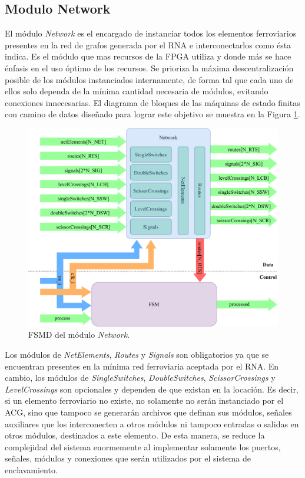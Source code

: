 \subsection{Modulo Network}

El módulo \textit{Network} es el encargado de instanciar todos los elementos ferroviarios presentes en la red de grafos generada por el RNA e interconectarlos como ésta indica. Es el módulo que mas recursos de la FPGA utiliza y donde más se hace énfasis en el uso óptimo de los recursos. Se prioriza la máxima descentralización posible de los módulos instanciados internamente, de forma tal que cada uno de ellos solo dependa de la mínima cantidad necesaria de módulos, evitando conexiones innecesarias. El diagrama de bloques de las máquinas de estado finitas con camino de datos diseñado para lograr este objetivo se muestra en la Figura \ref{fig:Network_module}.

\begin{figure}[H]
	\centering
	\includegraphics[width=1\textwidth]{Figuras/Network_module.png}
	\centering\caption{FSMD del módulo \textit{Network}.}
	\label{fig:Network_module}
\end{figure}

Los módulos de \textit{NetElements}, \textit{Routes} y \textit{Signals} son obligatorios ya que se encuentran presentes en la mínima red ferroviaria aceptada por el RNA. En cambio, los módulos de \textit{SingleSwitches}, \textit{DoubleSwitches}, \textit{ScissorCrossings} y \textit{LevelCrossings} son opcionales y dependen de que existan en la locación. Es decir, si un elemento ferroviario no existe, no solamente no serán instanciado por el ACG, sino que tampoco se generarán archivos que definan sus módulos, señales auxiliares que los interconecten a otros módulos ni tampoco entradas o salidas en otros módulos, destinados a este elemento. De esta manera, se reduce la complejidad del sistema enormemente al implementar solamente los puertos, señales, módulos y conexiones que serán utilizados por el sistema de enclavamiento.

